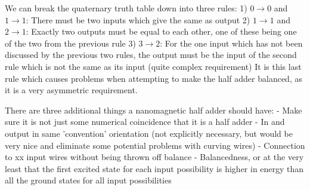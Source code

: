 \documentclass[11pt,a4paper,english]{article}
\begin{document}
We can break the quaternary truth table down into three rules:
1) $0\rightarrow0$ and $1\rightarrow1$: There must be two inputs which give the same as output
2) $1\rightarrow1$ and $2\rightarrow1$: Exactly two outputs must be equal to each other, one of these being one of the two from the previous rule
3) $3\rightarrow2$: For the one input which has not been discussed by the previous two rules, the output must be the input of the second rule which is not the same as its input (quite complex requirement)
It is this last rule which causes problems when attempting to make the half adder balanced, as it is a very asymmetric requirement.


There are three additional things a nanomagnetic half adder should have:
- Make sure it is not just some numerical coincidence that it is a half adder
- In and output in same 'convention' orientation (not explicitly necessary, but would be very nice and eliminate some potential problems with curving wires)
- Connection to xx input wires without being thrown off balance
- Balancedness, or at the very least that the first excited state for each input possibility is higher in energy than all the ground states for all input possibilities
\end{document}
